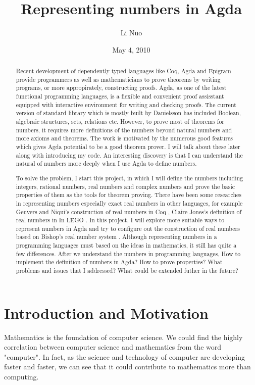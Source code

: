 \documentclass{article}
\author{Li Nuo}
\title{Representing numbers in Agda}
\theoremstyle{definition}
\begin{document}
\date{May 4, 2010}
\maketitle

\newpage
\tableofcontents

\newpage
\begin{abstract}
Recent development of dependently typed languages like Coq, Agda and Epigram provide programmers as well as mathematicians to prove theorems by writing programs, or more appropirately, constructing proofs. Agda, as one of the latest functional programming languages, is a flexible and convenient proof assisstant equipped with interactive environment for writing and checking proofs. The current version of standard library which is mostly built by Danielsson has included Boolean, algebraic structures, sets, relations etc. However, to prove most of theorems for numbers, it requires more definitions of the numbers beyond natural numbers and more axioms and theorems.
The work is motivated by the numerous good features which gives Agda potential to be a good theorem prover. I will talk about these later along with introducing my code.
 An interesting discovery is that I can understand the natural of numbers more deeply when I use Agda to define numbers.
 
To solve the problem, I start this project, in which I will define the numbers including integers, rational numbers, real numbers and complex numbers and prove the basic properties of them as the tools for theorem proving. There have been some researches in representing numbers especially exact real numbers in other languages, for example Geuvers and Niqui's construction of real numbers in Coq \cite{CRC}, Claire Jones's definition of real numbers in In LEGO \cite{jones}. In this project, I will explore more suitable ways to represent numbers in Agda and try to configure out the construction of real numbers based on Bishop's real number system \cite{bishop}. Although representing numbers in a programming languages must based on the ideas in mathematics, it still has quite a few differences. After we understand the numbers in programming languages, How to implement the definition of numbers in Agda? How to prove properties? What problems and issues that I addressed? What could be extended futher in the future?
\end{abstract}


\section{Introduction and Motivation}
Mathematics is the foundation of computer science. We could find the highly correlation between computer science and mathematics from the word "computer". In fact, as the science and technology of computer are developing faster and faster, we can see that it could contribute to mathematics more than computing.
\end{document}

